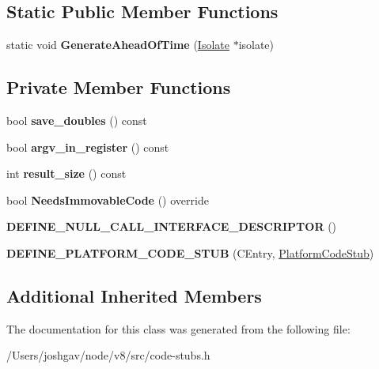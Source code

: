 \subsection*{Static Public Member Functions}
\begin{DoxyCompactItemize}
\item 
static void {\bfseries Generate\+Ahead\+Of\+Time} (\hyperlink{classv8_1_1internal_1_1_isolate}{Isolate} $\ast$isolate)\hypertarget{classv8_1_1internal_1_1_c_entry_stub_a745be7efd2cfdffd043bc90a1a2e6aea}{}\label{classv8_1_1internal_1_1_c_entry_stub_a745be7efd2cfdffd043bc90a1a2e6aea}

\end{DoxyCompactItemize}
\subsection*{Private Member Functions}
\begin{DoxyCompactItemize}
\item 
bool {\bfseries save\+\_\+doubles} () const \hypertarget{classv8_1_1internal_1_1_c_entry_stub_a7202a019c7fdfc299a7ce350bd66d227}{}\label{classv8_1_1internal_1_1_c_entry_stub_a7202a019c7fdfc299a7ce350bd66d227}

\item 
bool {\bfseries argv\+\_\+in\+\_\+register} () const \hypertarget{classv8_1_1internal_1_1_c_entry_stub_a3da7792fd1d2aba4b796256bb1e30132}{}\label{classv8_1_1internal_1_1_c_entry_stub_a3da7792fd1d2aba4b796256bb1e30132}

\item 
int {\bfseries result\+\_\+size} () const \hypertarget{classv8_1_1internal_1_1_c_entry_stub_acc7c37e0714e4ef4d25b00e063594e0c}{}\label{classv8_1_1internal_1_1_c_entry_stub_acc7c37e0714e4ef4d25b00e063594e0c}

\item 
bool {\bfseries Needs\+Immovable\+Code} () override\hypertarget{classv8_1_1internal_1_1_c_entry_stub_afc8ce3b6bea7b8a7fda8b4778b67f529}{}\label{classv8_1_1internal_1_1_c_entry_stub_afc8ce3b6bea7b8a7fda8b4778b67f529}

\item 
{\bfseries D\+E\+F\+I\+N\+E\+\_\+\+N\+U\+L\+L\+\_\+\+C\+A\+L\+L\+\_\+\+I\+N\+T\+E\+R\+F\+A\+C\+E\+\_\+\+D\+E\+S\+C\+R\+I\+P\+T\+OR} ()\hypertarget{classv8_1_1internal_1_1_c_entry_stub_a75ac7885490633fd95af9596eb2ac45c}{}\label{classv8_1_1internal_1_1_c_entry_stub_a75ac7885490633fd95af9596eb2ac45c}

\item 
{\bfseries D\+E\+F\+I\+N\+E\+\_\+\+P\+L\+A\+T\+F\+O\+R\+M\+\_\+\+C\+O\+D\+E\+\_\+\+S\+T\+UB} (C\+Entry, \hyperlink{classv8_1_1internal_1_1_platform_code_stub}{Platform\+Code\+Stub})\hypertarget{classv8_1_1internal_1_1_c_entry_stub_aaeff26b88f0177dae4c05b27772f348b}{}\label{classv8_1_1internal_1_1_c_entry_stub_aaeff26b88f0177dae4c05b27772f348b}

\end{DoxyCompactItemize}
\subsection*{Additional Inherited Members}


The documentation for this class was generated from the following file\+:\begin{DoxyCompactItemize}
\item 
/\+Users/joshgav/node/v8/src/code-\/stubs.\+h\end{DoxyCompactItemize}
